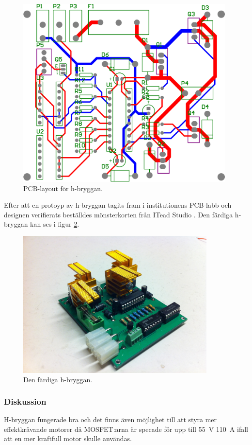\begin{figure}[htbp!]
\centering
\includegraphics[width=11cm]{../../includes/figures/H_brygga_pcb}
\caption{PCB-layout för h-bryggan.}
\label{fig:pcb_layout}
\end{figure}

Efter att en protoyp av h-bryggan tagits fram i institutionens PCB-labb och
designen verifierats beställdes mönsterkorten från ITead Studio \cite{ITead Studio}. Den färdiga h-bryggan kan ses i figur \ref{fig:mounted_h_bridge}.

\begin{figure}[htbp!]
\centering
\includegraphics[width=10cm]{../../includes/figures/Hbridge}
\caption{Den färdiga h-bryggan.}
\label{fig:mounted_h_bridge}
\end{figure}

\subsubsection{Diskussion}
H-bryggan fungerade bra och det finns även möjlighet till att styra mer
effektkrävande motorer då MOSFET:arna är specade för upp till 55~V 110~A ifall
att en mer kraftfull motor skulle användas.

